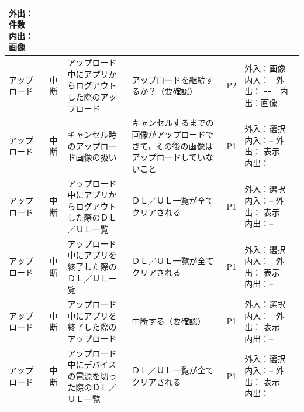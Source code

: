 \begin{table}[htbp]
\begin{tabular}{|p{8em}|p{7em}|p{9em}|p{9em}|p{3em}|p{12em}|}
外出： 件数　内出：画像 \bigstrut\\
    \hline
    アップロード & 中断    & アップロード中にアプリからログアウトした際のアップロード & アップロードを継続するか？（要確認） & P2    & 外入：画像　内入：--
外出： ｰｰ　内出：画像 \bigstrut\\
    \hline
    アップロード & 中断    & キャンセル時のアップロード画像の扱い & キャンセルするまでの画像がアップロードできて，その後の画像はアップロードしていないこと & P1    & 外入：選択　内入：--
外出： 表示　内出：-- \bigstrut\\
    \hline
    アップロード & 中断    & アップロード中にアプリからログアウトした際のＤＬ／ＵＬ一覧 & ＤＬ／ＵＬ一覧が全てクリアされる & P1    & 外入：選択　内入：--
外出： 表示　内出：-- \bigstrut\\
    \hline
    アップロード & 中断    & アップロード中にアプリを終了した際のＤＬ／ＵＬ一覧 & ＤＬ／ＵＬ一覧が全てクリアされる & P1    & 外入：選択　内入：--
外出： 表示　内出：-- \bigstrut\\
    \hline
    アップロード & 中断    & アップロード中にアプリを終了した際のアップロード & 中断する（要確認） & P1    & 外入：選択　内入：--
外出： 表示　内出：-- \bigstrut\\
    \hline
    アップロード & 中断    & アップロード中にデバイスの電源を切った際のＤＬ／ＵＬ一覧 & ＤＬ／ＵＬ一覧が全てクリアされる & P1    & 外入：選択　内入：--
外出： 表示　内出：-- \bigstrut\\
    \hline
    \end{tabular}%
  \label{tab:D-4-ER2-3}%
\end{table}%


